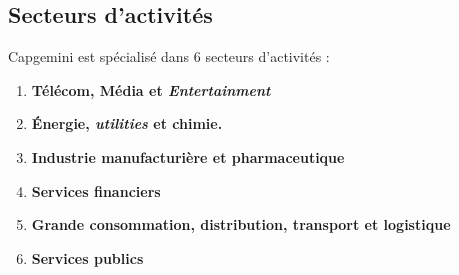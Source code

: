 \subsection{Secteurs d'activités}
Capgemini est spécialisé dans 6 secteurs d'activités :
\\
\begin{enumerate}
\item \textbf{Télécom, Média et \textit{Entertainment}}
\item \textbf{\'Energie, \textit{utilities} et chimie.}
\item \textbf{Industrie manufacturière et pharmaceutique}
\item \textbf{Services financiers}
\item \textbf{Grande consommation, distribution, transport et logistique}
\item \textbf{Services publics}\\
\end{enumerate}
\begin{figure}[h]
\end{figure}
\newpage
